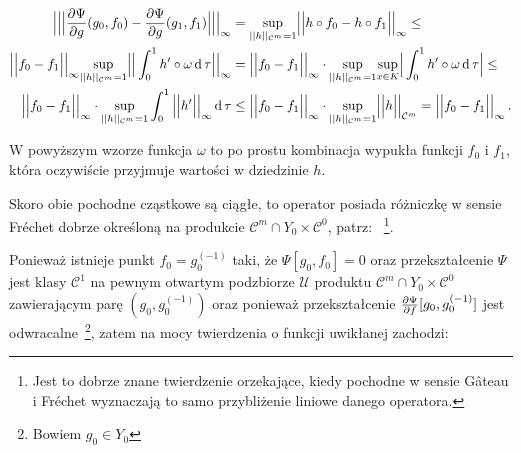 \begin{align*}
\begin{split}
	\Big|\Big|\Big| \frac{\partial \Psi}{\partial g}(g_0, f_0) - \frac{\partial \Psi}{\partial g}(g_1, f_1)\Big|\Big|\Big|_{\infty} &= \underset{||h||_{\mathcal{C}^{m}} = 1}{\sup} \Big|\Big| h \circ f_0 - h \circ f_1 \Big|\Big|_{\infty} \leq \\
\Big|\Big| f_0 - f_1\Big|\Big|_{\infty} \underset{||h||_{\mathcal{C}^{m}}=1}{\sup}  \Big|\Big| \int_0^1 h' \circ \omega \,\mathrm{d}\, \tau  \Big|\Big|_{\infty} 
&=  \Big|\Big| f_0 - f_1\Big|\Big|_{\infty} \cdot \underset{||h||_{\mathcal{C}^{m}}=1}{\sup} \underset{x\in K}{\sup}\Big| \int_0^1 h' \circ \omega \,\mathrm{d}\, \tau\Big| \leq\\
\Big|\Big| f_0 - f_1\Big|\Big|_{\infty} \cdot \underset{||h||_{\mathcal{C}^{m}}=1}{\sup} \int_0^1 \Big|\Big|h' \Big|\Big|_{\infty}\,\mathrm{d}\, \tau 
&\leq \Big|\Big| f_0 - f_1\Big|\Big|_{\infty} \cdot \underset{||h||_{\mathcal{C}^{m}}=1}{\sup}\Big|\Big|h \Big|\Big|_{\mathcal{C}^{m}} = \Big|\Big| f_0 - f_1\Big|\Big|_{\infty} \,.
\end{split}
\end{align*}

W powyższym wzorze funkcja $\omega$ to po prostu kombinacja wypukła funkcji $f_0$ i $f_1$, która oczywiście przyjmuje wartości w dziedzinie $h$.

Skoro obie pochodne cząstkowe są ciągłe, to operator posiada różniczkę w sensie Fr\' echet dobrze określoną na produkcie $\mathcal{C}^{m} \cap Y_0 \times \mathcal{C}^{0}$, patrz: \citet[][lem. 2.4.12 , str. 78]{Mardsen}~\footnote{Jest to dobrze znane twierdzenie orzekające, kiedy pochodne w sensie G\^ateau i Fr\' echet wyznaczają to samo przybliżenie liniowe danego operatora.}. 

Ponieważ istnieje punkt $f_0 = g_0^{(-1)}$ taki, że $\Psi[g_0,f_0]=0$ oraz przekształcenie $\Psi$ jest klasy $\mathcal{C}^1$ na pewnym otwartym podzbiorze $\mathcal{U}$ produktu $\mathcal{C}^{m} \cap Y_0 \times \mathcal{C}^{0}$ zawierającym parę $(g_0, g_0^{(-1)})$ oraz ponieważ przekształcenie $\frac{\partial \Psi}{\partial f}[g_0,g_0^{(-1)}]$ jest odwracalne~\footnote{Bowiem $g_0\in Y_0 $}, zatem na mocy twierdzenia o funkcji uwikłanej \citep[][twr. VIII.3.2, str. 216]{Maurin} zachodzi:

